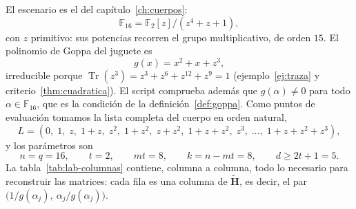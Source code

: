 \documentclass[11pt,a4paper,oneside]{report}
\newcommand{\F}{\mathbb{F}}
\newcommand{\GF}[1]{\mathbb{F}_{#1}}
\newcommand{\Hmat}{\mathbf{H}}          %
\DeclareMathOperator{\Tr}{Tr}
\begin{document}
El escenario es el del capítulo~\ref{ch:cuerpos}:
\[
\GF{16}=\F_2[z]/(z^4+z+1),
\]
con $z$ primitivo: sus potencias recorren el grupo multiplicativo, de
orden $15$. El polinomio de Goppa del juguete es
\[
g(x)=x^2+x+z^3,
\]
irreducible porque $\Tr(z^3)=z^3+z^6+z^{12}+z^9=1$
(ejemplo~\ref{ej:traza} y criterio~\ref{thm:cuadratica}). El script
comprueba además que $g(\alpha)\neq0$ para todo $\alpha\in\GF{16}$, que
es la condición de la definición~\ref{def:goppa}. Como puntos de
evaluación tomamos la lista completa del cuerpo en orden natural,
\[
L=(0,\;1,\;z,\;1+z,\;z^2,\;1+z^2,\;z+z^2,\;1+z+z^2,\;z^3,\;\ldots,\;1+z+z^2+z^3),
\]
y los parámetros son
\[
n=q=16,\qquad t=2,\qquad mt=8,\qquad k=n-mt=8,\qquad d\ge 2t+1=5 .
\]
La tabla~\ref{tab:lab-columnas} contiene, columna a columna, todo lo
necesario para reconstruir las matrices: cada fila es una columna de
$\tilde{\Hmat}$, es decir, el par $\bigl(1/g(\alpha_j),\ \alpha_j/g(\alpha_j)\bigr)$.
\end{document}

